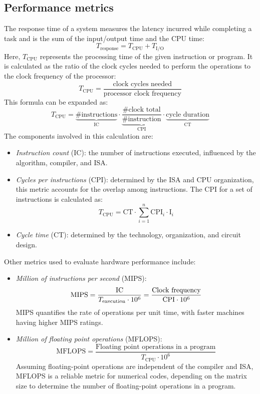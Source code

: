 \subsection{Performance metrics}
The response time of a system measures the latency incurred while completing a task and is the sum of the input/output time and the CPU time:
\[T_{\text{response}}=T_{\text{CPU}} + T_{\text{I/O}}\]
Here, $T_{\text{CPU}}$ represents the processing time of the given instruction or program.
It is calculated as the ratio of the clock cycles needed to perform the operations to the clock frequency of the processor:
\[T_{\text{CPU}} = \dfrac{\text{clock cycles needed}}{\text{processor clock frequency}}\] 
This formula can be expanded as: 
\[T_{\text{CPU}}=\underbrace{\#\text{instructions}}_{\text{IC}} \cdot \underbrace{\dfrac{\#\text{clock total}}{\#\text{instruction}}}_{\text{CPI}} \cdot \underbrace{\text{cycle duration}}_{\text{CT}} \]
The components involved in this calculation are:
\begin{itemize}
    \item \textit{Instruction count} (IC): the number of instructions executed, influenced by the algorithm, compiler, and ISA.
    \item \textit{Cycles per instructions} (CPI): determined by the ISA and CPU organization, this metric accounts for the overlap among instructions. 
        The CPI for a set of instructions is calculated as:
        \[T_{\text{CPU}}=\text{CT} \cdot \sum_{i=1}^{n}\text{CPI}_i \cdot \text{I}_i\]
    \item \textit{Cycle time} (CT): determined by the technology, organization, and circuit design.
\end{itemize}
Other metrics used to evaluate hardware performance include:
\begin{itemize}
    \item \textit{Million of instructions per second} (MIPS): 
        \[\text{\text{MIPS}}=\dfrac{\text{IC}}{T_{\text{execution}} \cdot 10^6}=\dfrac{\text{Clock frequency}}{\text{CPI} \cdot 10^6}\]
        MIPS quantifies the rate of operations per unit time, with faster machines having higher MIPS ratings.
    \item \textit{Million of floating point operations} (MFLOPS): 
        \[\text{MFLOPS}=\dfrac{\text{Floating point operations in a program}}{T_{\text{CPU}} \cdot 10^6}\]
        Assuming floating-point operations are independent of the compiler and ISA, MFLOPS is a reliable metric for numerical codes, depending on the matrix size to determine the number of floating-point operations in a program.
\end{itemize}

